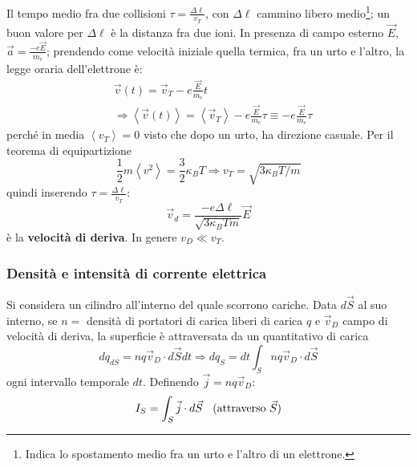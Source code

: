 \documentclass[a4paper]{scrartcl}
\numberwithin{equation}{subsection}
\theoremstyle{style1}
\begin{document}
Il tempo medio fra due collisioni $\tau  = \frac{\Delta \ell }{v_T}$, con $\Delta \ell $ cammino libero medio\footnote{Indica lo spostamento medio fra un urto e l'altro di un elettrone.}; un buon valore per $\Delta \ell $ \`e la distanza fra due ioni. In presenza di campo esterno $\vec{E}$, $\vec{a} = \frac{- e\vec{E}}{m_e}$; prendendo come velocit\`a iniziale quella termica, fra un urto e l'altro, la legge oraria dell'elettrone \`e:
\begin{equation}
	\begin{split}
		&\vec{v}(t)  =  \vec{v}_T  - e \frac{\vec{E}}{m_e} t\\
		&\Rightarrow \left\langle \vec{v}(t) \right\rangle  =  \left\langle \vec{v}_T  \right\rangle - e \frac{\vec{E}}{m_e} \tau  \equiv - e \frac{\vec{E}}{m_e} \tau 
	\end{split}
\end{equation}
perch\'e in media $\left\langle v_T \right\rangle=0$ visto che dopo un urto, ha direzione casuale. Per il teorema di equipartizione
\begin{equation}
	\frac{1}{2}m\left\langle v^2 \right\rangle= \frac{3}{2}\kappa _BT\Rightarrow v_T = \sqrt{3 \kappa _B T / m} 
\end{equation}
quindi inserendo $\tau  = \frac{\Delta \ell }{v_T}$:
\begin{equation}
	\vec{v}_d = \frac{-e \Delta \ell }{\sqrt{3 \kappa _B T m } }\vec{E}
\end{equation}
\`e la \textbf{velocit\`a di deriva}. In genere $v_D \ll v_T$.

\subsubsection{Densit\`a e intensit\`a di corrente elettrica}

Si considera un cilindro all'interno del quale scorrono cariche. Data $d\vec{S}$ al suo interno, se $n =$ densit\`a di portatori di carica liberi di carica $q$ e $\vec{v}_D$ campo di velocit\`a di deriva, la superficie \`e attraversata da un quantitativo di carica
\begin{equation}
	dq_{dS}  = nq \vec{v}_D \cdot d\vec{S}dt\Rightarrow dq_{S} = dt \int_{S} nq\vec{v}_D \cdot d\vec{S} 
\end{equation}
ogni intervallo temporale $dt$. Definendo $\vec{j} = nq \vec{v}_D$:
\begin{equation}
	I_S = \int_{S} \vec{j}\cdot d\vec{S}\hspace{2mm} \text{ (attraverso } \vec{S}\text{)}
\end{equation}
\end{document}
